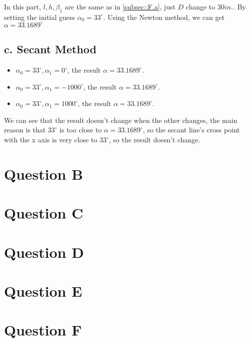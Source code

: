 \documentclass[a4paper]{article}
\begin{document}
In this part, $l,h,\beta_1$ are the same as in \ref{subsec::F.a}, just $D$ change to $30 in.$. By setting the initial guess $\alpha_0 = 33^\circ$. Using the Newton method, we can get $\alpha = 33.1689^\circ$


\subsection*{c. Secant Method}

\begin{itemize}
	\item $\alpha_0=33^\circ, \alpha_1=0^\circ$, the result $\alpha = 33.1689^\circ$. 
	\item $\alpha_0=33^\circ, \alpha_1=-1000^\circ$, the result $\alpha = 33.1689^\circ$. 
	\item $\alpha_0=33^\circ, \alpha_1=1000^\circ$, the result $\alpha = 33.1689^\circ$. 
\end{itemize}


We can see that the result doesn't change when the other changes, the main reason is that $33^\circ$ is too close to $\alpha = 33.1689^\circ$, so the secant line's cross point with the x axis is very close to $33^\circ$, so the result doesn't change.
\section*{  }

\printbibliography

\begin{appendices}
	\section*{Question B}
	\label{appendices::QB}
	

	\section*{Question C}
	

	\section*{Question D}
	

	\section*{Question E}
	

	\section*{Question F}
	
\end{appendices}
\end{document}
